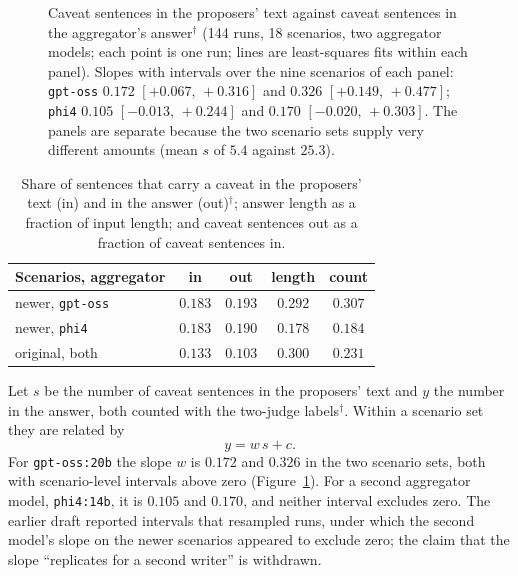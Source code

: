\documentclass[10pt,twocolumn]{article}
\newcommand{\ci}[2]{\ensuremath{[#1,\,#2]}}
\begin{document}
\begin{figure}[t]
\caption{Caveat sentences in the proposers' text against caveat
sentences in the aggregator's answer$^\dagger$ (144 runs, 18 scenarios,
two aggregator models; each point is one run; lines are least-squares
fits within each panel). Slopes with intervals over the nine scenarios
of each panel: \texttt{gpt-oss} $0.172$ \ci{+0.067}{+0.316} and
$0.326$ \ci{+0.149}{+0.477}; \texttt{phi4} $0.105$
\ci{-0.013}{+0.244} and $0.170$ \ci{-0.020}{+0.303}. The panels are
separate because the two scenario sets supply very different amounts
(mean $s$ of $5.4$ against $25.3$).}
\label{fig:transport}
\end{figure}

\begin{table}[t]
\centering\footnotesize
\setlength{\tabcolsep}{3pt}
\begin{tabular}{lcccc}
\toprule
Scenarios, aggregator & in & out & length & count \\
\midrule
newer, \texttt{gpt-oss} & $0.183$ & $0.193$ & $0.292$ & $0.307$ \\
newer, \texttt{phi4} & $0.183$ & $0.190$ & $0.178$ & $0.184$ \\
original, both & $0.133$ & $0.103$ & $0.300$ & $0.231$ \\
\bottomrule
\end{tabular}
\caption{Share of sentences that carry a caveat in the proposers' text
(in) and in the answer (out)$^\dagger$; answer length as a fraction of
input length; and caveat sentences out as a fraction of caveat
sentences in.}
\label{tab:shares}
\end{table}

Let $s$ be the number of caveat sentences in the proposers' text and
$y$ the number in the answer, both counted with the two-judge
labels$^\dagger$. Within a scenario set they are related by
\begin{equation}
y = w\,s + c .
\label{eq:transport}
\end{equation}
For \texttt{gpt-oss:20b} the slope $w$ is $0.172$ and $0.326$ in the
two scenario sets, both with scenario-level intervals above zero
(Figure~\ref{fig:transport}). For a second aggregator model,
\texttt{phi4:14b}, it is $0.105$ and $0.170$, and neither interval
excludes zero. The earlier draft reported intervals that resampled
runs, under which the second model's slope on the newer scenarios
appeared to exclude zero; the claim that the slope ``replicates for a
second writer'' is withdrawn.
\end{document}
